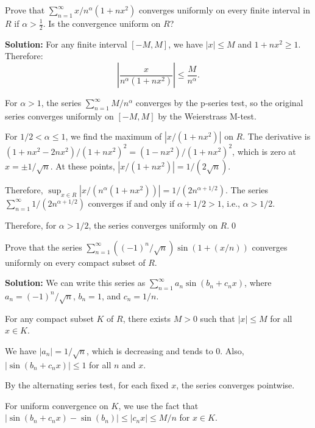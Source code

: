 \begin{problembox}
Prove that \(\sum_{n=1}^{\infty} x/n^\alpha (1 + nx^2)\) converges uniformly on every finite interval in \( R \) if \( \alpha > \frac{1}{2} \). Is the convergence uniform on \( R \)?
\end{problembox}

\bigskip\noindent\textbf{Solution:} For any finite interval \([-M, M]\), we have \( |x| \leq M \) and \( 1 + nx^2 \geq 1 \). Therefore:
\[\left|\frac{x}{n^\alpha (1 + nx^2)}\right| \leq \frac{M}{n^\alpha}.\]

For \( \alpha > 1 \), the series \( \sum_{n=1}^{\infty} M/n^\alpha \) converges by the p-series test, so the original series converges uniformly on \([-M, M]\) by the Weierstrass M-test.

For \( 1/2 < \alpha \leq 1 \), we find the maximum of \( |x/(1 + nx^2)| \) on \( R \). The derivative is \( (1 + nx^2 - 2nx^2)/(1 + nx^2)^2 = (1 - nx^2)/(1 + nx^2)^2 \), which is zero at \( x = \pm 1/\sqrt{n} \). At these points, \( |x/(1 + nx^2)| = 1/(2\sqrt{n}) \).

Therefore, \( \sup_{x \in R} |x/(n^\alpha (1 + nx^2))| = 1/(2n^{\alpha + 1/2}) \). The series \( \sum_{n=1}^{\infty} 1/(2n^{\alpha + 1/2}) \) converges if and only if \( \alpha + 1/2 > 1 \), i.e., \( \alpha > 1/2 \).

Therefore, for \( \alpha > 1/2 \), the series converges uniformly on \( R \).\qed


\begin{problembox}
Prove that the series \(\sum_{n=1}^{\infty} ((-1)^n/\sqrt{n}) \sin (1 + (x/n))\) converges uniformly on every compact subset of \( R \).
\end{problembox}

\bigskip\noindent\textbf{Solution:} We can write this series as \( \sum_{n=1}^{\infty} a_n \sin(b_n + c_n x) \), where \( a_n = (-1)^n/\sqrt{n} \), \( b_n = 1 \), and \( c_n = 1/n \).

For any compact subset \( K \) of \( R \), there exists \( M > 0 \) such that \( |x| \leq M \) for all \( x \in K \).

We have \( |a_n| = 1/\sqrt{n} \), which is decreasing and tends to 0. Also, \( |\sin(b_n + c_n x)| \leq 1 \) for all \( n \) and \( x \).

By the alternating series test, for each fixed \( x \), the series converges pointwise.

For uniform convergence on \( K \), we use the fact that \( |\sin(b_n + c_n x) - \sin(b_n)| \leq |c_n x| \leq M/n \) for \( x \in K \).

